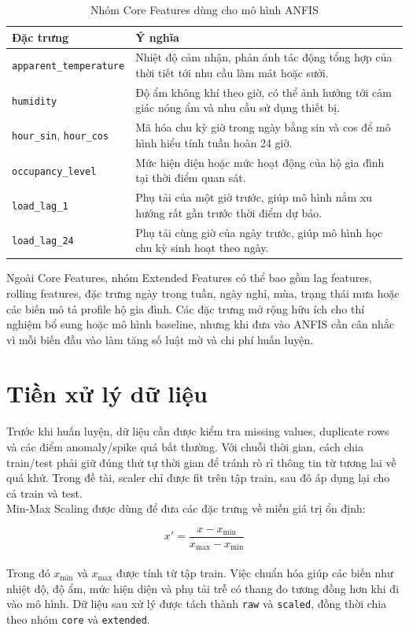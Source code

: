 \begin{table}[H]
  \centering
  \begin{tabular}{p{5.2cm} p{7.9cm}}
    \toprule
    \textbf{Đặc trưng} & \textbf{Ý nghĩa} \\
    \midrule
    \texttt{apparent\_temperature} & Nhiệt độ cảm nhận, phản ánh tác động tổng hợp của thời tiết tới nhu cầu làm mát hoặc sưởi. \\
    \texttt{humidity} & Độ ẩm không khí theo giờ, có thể ảnh hưởng tới cảm giác nóng ẩm và nhu cầu sử dụng thiết bị. \\
    \texttt{hour\_sin}, \texttt{hour\_cos} & Mã hóa chu kỳ giờ trong ngày bằng sin và cos để mô hình hiểu tính tuần hoàn 24 giờ. \\
    \texttt{occupancy\_level} & Mức hiện diện hoặc mức hoạt động của hộ gia đình tại thời điểm quan sát. \\
    \texttt{load\_lag\_1} & Phụ tải của một giờ trước, giúp mô hình nắm xu hướng rất gần trước thời điểm dự báo. \\
    \texttt{load\_lag\_24} & Phụ tải cùng giờ của ngày trước, giúp mô hình học chu kỳ sinh hoạt theo ngày. \\
    \bottomrule
  \end{tabular}
  \caption{Nhóm Core Features dùng cho mô hình ANFIS}
\end{table}

Ngoài Core Features, nhóm Extended Features có thể bao gồm lag features, rolling features, đặc trưng ngày trong tuần, ngày nghỉ, mùa, trạng thái mưa hoặc các biến mô tả profile hộ gia đình. Các đặc trưng mở rộng hữu ích cho thí nghiệm bổ sung hoặc mô hình baseline, nhưng khi đưa vào ANFIS cần cân nhắc vì mỗi biến đầu vào làm tăng số luật mờ và chi phí huấn luyện.

\section{Tiền xử lý dữ liệu}

Trước khi huấn luyện, dữ liệu cần được kiểm tra missing values, duplicate rows và các điểm anomaly/spike quá bất thường. Với chuỗi thời gian, cách chia train/test phải giữ đúng thứ tự thời gian để tránh rò rỉ thông tin từ tương lai về quá khứ. Trong đề tài, scaler chỉ được fit trên tập train, sau đó áp dụng lại cho cả train và test.
\\
Min-Max Scaling được dùng để đưa các đặc trưng về miền giá trị ổn định:

\begin{equation}
  x' = \frac{x - x_{\min}}{x_{\max} - x_{\min}}
\end{equation}
\\
Trong đó $x_{\min}$ và $x_{\max}$ được tính từ tập train. Việc chuẩn hóa giúp các biến như nhiệt độ, độ ẩm, mức hiện diện và phụ tải trễ có thang đo tương đồng hơn khi đi vào mô hình. Dữ liệu sau xử lý được tách thành \texttt{raw} và \texttt{scaled}, đồng thời chia theo nhóm \texttt{core} và \texttt{extended}.

